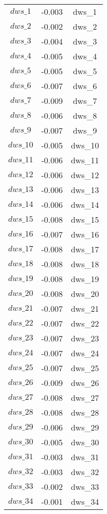 \begin{center}
\begin{longtable}{ccc}
$dws\_1$ 	 & 	 -0.003 	 & 	 dws\_1\\
$dws\_2$ 	 & 	 -0.002 	 & 	 dws\_2\\
$dws\_3$ 	 & 	 -0.004 	 & 	 dws\_3\\
$dws\_4$ 	 & 	 -0.005 	 & 	 dws\_4\\
$dws\_5$ 	 & 	 -0.005 	 & 	 dws\_5\\
$dws\_6$ 	 & 	 -0.007 	 & 	 dws\_6\\
$dws\_7$ 	 & 	 -0.009 	 & 	 dws\_7\\
$dws\_8$ 	 & 	 -0.006 	 & 	 dws\_8\\
$dws\_9$ 	 & 	 -0.007 	 & 	 dws\_9\\
$dws\_10$ 	 & 	 -0.005 	 & 	 dws\_10\\
$dws\_11$ 	 & 	 -0.006 	 & 	 dws\_11\\
$dws\_12$ 	 & 	 -0.006 	 & 	 dws\_12\\
$dws\_13$ 	 & 	 -0.006 	 & 	 dws\_13\\
$dws\_14$ 	 & 	 -0.006 	 & 	 dws\_14\\
$dws\_15$ 	 & 	 -0.008 	 & 	 dws\_15\\
$dws\_16$ 	 & 	 -0.007 	 & 	 dws\_16\\
$dws\_17$ 	 & 	 -0.008 	 & 	 dws\_17\\
$dws\_18$ 	 & 	 -0.008 	 & 	 dws\_18\\
$dws\_19$ 	 & 	 -0.008 	 & 	 dws\_19\\
$dws\_20$ 	 & 	 -0.008 	 & 	 dws\_20\\
$dws\_21$ 	 & 	 -0.007 	 & 	 dws\_21\\
$dws\_22$ 	 & 	 -0.007 	 & 	 dws\_22\\
$dws\_23$ 	 & 	 -0.007 	 & 	 dws\_23\\
$dws\_24$ 	 & 	 -0.007 	 & 	 dws\_24\\
$dws\_25$ 	 & 	 -0.007 	 & 	 dws\_25\\
$dws\_26$ 	 & 	 -0.009 	 & 	 dws\_26\\
$dws\_27$ 	 & 	 -0.008 	 & 	 dws\_27\\
$dws\_28$ 	 & 	 -0.008 	 & 	 dws\_28\\
$dws\_29$ 	 & 	 -0.006 	 & 	 dws\_29\\
$dws\_30$ 	 & 	 -0.005 	 & 	 dws\_30\\
$dws\_31$ 	 & 	 -0.003 	 & 	 dws\_31\\
$dws\_32$ 	 & 	 -0.003 	 & 	 dws\_32\\
$dws\_33$ 	 & 	 -0.002 	 & 	 dws\_33\\
$dws\_34$ 	 & 	 -0.001 	 & 	 dws\_34\\

\end{longtable}
\end{center}
